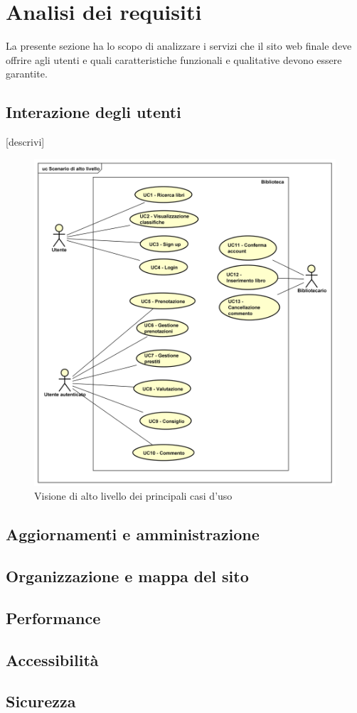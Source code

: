 \section{Analisi dei requisiti}
La presente sezione ha lo scopo di analizzare i servizi che il sito web finale deve offrire agli utenti e quali caratteristiche funzionali e qualitative devono essere garantite.

\subsection{Interazione degli utenti}
[descrivi]

\begin{figure}[H]
	\centering
	\includegraphics[width= 14cm]{immagini/user_case.png}
	\caption{Visione di alto livello dei principali casi d'uso}
\end{figure}


\subsection{Aggiornamenti e amministrazione}


\subsection{Organizzazione e mappa del sito}

\subsection{Performance}


\subsection{Accessibilità}


\subsection{Sicurezza}